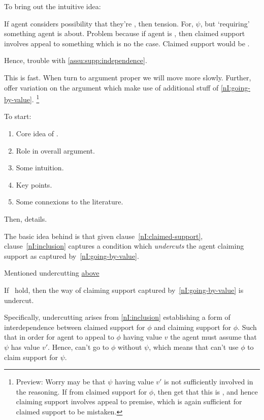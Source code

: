 \begin{note}
  To bring out the intuitive idea:

  If agent considers possibility that they're \mom{}, then tension.
  For, \(\psi\), but `requiring' something agent is \mom{} about.
  Problem because if agent is \mom{}, then claimed support involves appeal to something which is no the case.
  Claimed support would be \mom{}.

  Hence, trouble with \autoref{assu:supp:independence}.

  This is fast.
  When turn to argument proper we will move more slowly.
  Further, offer variation on the argument which make use of additional stuff of \ref{nI:going-by-value}.\nolinebreak
  \footnote{
    Preview:
    Worry may be that \(\psi\) having value \(v'\) is not sufficiently involved in the reasoning.
    If from claimed support for \(\phi\), then get that this is \mom{}, and hence claiming support involves appeal to \mom{} premise, which is again sufficient for claimed support to be mistaken.
  }
\end{note}

\begin{note}[Plan]
  To start:
  \begin{enumerate}
  \item Core idea of \nI{}.
  \item Role in overall argument.
  \item Some intuition.
  \item Key points.
  \item Some connexions to the literature.
  \end{enumerate}
  Then, details.
\end{note}

\begin{note}
  The basic idea behind \nI{} is that given clause~\ref{nI:claimed-support}, clause~\ref{nI:inclusion} captures a condition which \emph{undercuts} the agent claiming support as captured by~\ref{nI:going-by-value}.

  Mentioned undercutting {\color{red} \hyperref[first-mention-undercutting-defeater]{above}}

  If~\nIBackground{} hold, then the way of claiming support captured by~\ref{nI:going-by-value} is undercut.

  {
    \color{red}
    Specifically, undercutting arises from \ref{nI:inclusion} establishing a form of interdependence between claimed support for \(\phi\) and claiming support for \(\phi\).
  }
  Such that in order for agent to appeal to \(\phi\) having value \(v\) the agent must assume that \(\psi\) has value \(v'\).
  Hence, can't go to \(\phi\) without \(\psi\), which means that can't use \(\phi\) to claim support for \(\psi\).
\end{note}

